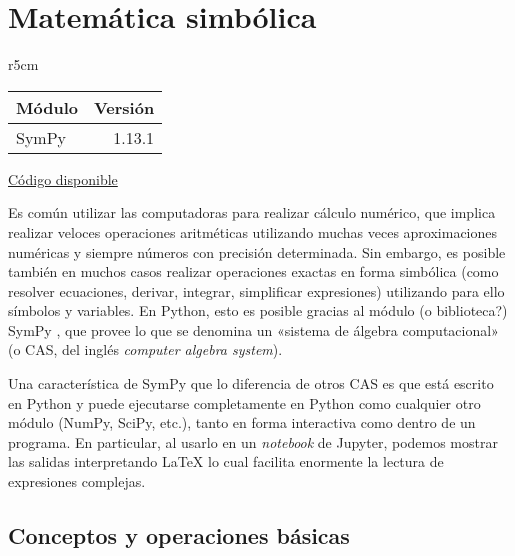 

\chapter{Matemática simbólica} \label{ch:simbolica}  

\begin{wraptable}{r}{5cm}
\begin{modulesinfo}
\begin{center}
{\small
    \begin{tabular}{l r}
        \toprule
        \textbf{Módulo} & \textbf{Versión} \\
        \midrule
        SymPy & 1.13.1 \\
        \bottomrule
    \end{tabular}
    \vspace{0.75em}
    \href{https://github.com/facundobatista/libro-pyciencia/tree/master/código/matematica_simbolica/}{Código disponible}
}
\end{center}
\end{modulesinfo}
\end{wraptable}


Es común utilizar las computadoras para realizar cálculo numérico, que implica realizar veloces operaciones aritméticas utilizando muchas veces aproximaciones numéricas y siempre números con precisión determinada. Sin embargo, es posible también en muchos casos realizar operaciones exactas en forma simbólica (como resolver ecuaciones, derivar, integrar, simplificar expresiones) utilizando para ello símbolos y variables. En Python, esto es posible gracias al módulo (o biblioteca?) SymPy \cite{sympy}, que provee lo que se denomina un «sistema de álgebra computacional» (o CAS, del inglés \textit{computer algebra system}). 

Una característica de SymPy que lo diferencia de otros CAS es que está escrito en Python y puede ejecutarse completamente en Python como cualquier otro módulo (NumPy, SciPy, etc.), tanto en forma interactiva como dentro de un programa. En particular, al usarlo en un \textit{notebook} de Jupyter, podemos mostrar las salidas interpretando \LaTeX{} lo cual facilita enormente la lectura de expresiones complejas.

\section{Conceptos y operaciones básicas}

